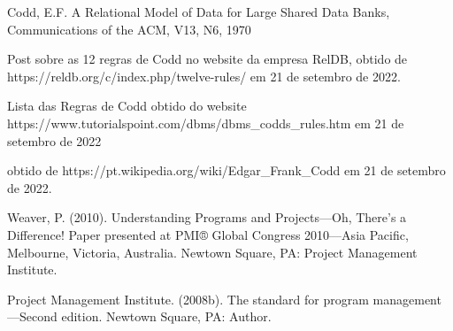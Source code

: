 \documentclass[
12pt,		%
openright,	%
twoside,  %
a4paper,			%
chapter=TITLE,		%
english,			%
french,				%
spanish,			%
brazil				%
]{USPSC-classe/USPSC}
\begin{document}
\begin{flushleft}
\begin{flushleft}
[CODD, 1970] Codd, E.F. A Relational Model of Data for Large Shared Data Banks, Communications of the ACM, V13, N6, 1970
\end{flushleft}


\end{flushleft}


\begin{flushleft}
\begin{flushleft}
[RelDB, 2019] Post sobre as 12 regras de Codd no website da empresa RelDB, obtido de https://reldb.org/c/index.php/twelve-rules/ em 21 de setembro de 2022.
\end{flushleft}


\end{flushleft}


\begin{flushleft}
\begin{flushleft}
[TutorialsPoint, 2022] Lista das Regras de Codd obtido do website https://www.tutorialspoint.com/dbms/dbms\_codds\_rules.htm em 21 de setembro de 2022
\end{flushleft}


\end{flushleft}


\begin{flushleft}
\begin{flushleft}
 obtido de https://pt.wikipedia.org/wiki/Edgar\_Frank\_Codd em 21 de setembro de 2022.
\end{flushleft}


\end{flushleft}


\begin{flushleft}
\begin{flushleft}
[Weaver, 2010] Weaver, P. (2010). Understanding Programs and Projects—Oh, There's a Difference! Paper presented at PMI® Global Congress 2010—Asia Pacific, Melbourne, Victoria, Australia. Newtown Square, PA: Project Management Institute.
\end{flushleft}


\end{flushleft}


\begin{flushleft}
\begin{flushleft}
[PMI, 2008] Project Management Institute. (2008b). The standard for program management—Second edition. Newtown Square, PA: Author.
\end{flushleft}


\end{flushleft}
\end{document}
